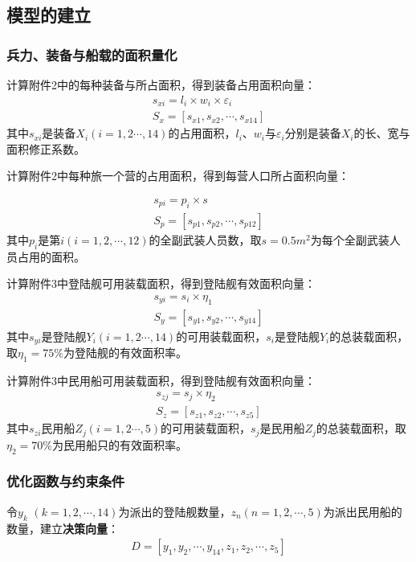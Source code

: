 \documentclass{whutmod}
\begin{document}
	    \subsection{模型的建立}
	    \subsubsection{兵力、装备与船载的面积量化}


	    计算附件2中的每种装备与所占面积，得到装备占用面积向量：
	    \begin{gather*}
	    s_{xi}=l_{i}\times w_{i} \times \varepsilon _{i}\\
	        S_{x}=[s_{x1},s_{x2},\cdots,s_{x14}]
	    \end{gather*}
	    其中$s_{xi}$是装备$X_{i}(i=1,2\cdots,14)$的占用面积，$l_{i}$、$w_{i}$与$\varepsilon _{i}$分别是装备$X_{i}$的长、宽与面积修正系数。
	    
	     计算附件2中每种旅一个营的占用面积，得到每营人口所占面积向量：


	     \begin{gather*}
	     s_{pi}=p_{i}\times s\\
	     S_{p}=[s_{p1},s_{p2},\cdots,s_{p12}]
	     \end{gather*}
	     其中$p_{i}$是第$i(i=1,2,\cdots,12)$的全副武装人员数，取$s=0.5m^2$为每个全副武装人员占用的面积。
	     
	     计算附件3中登陆舰可用装载面积，得到登陆舰有效面积向量：
	      \begin{gather*}
	      s_{yi}=s_{i}\times \eta_{1}\\
	      S_{y}=[s_{y1},s_{y2},\cdots,s_{y14}]
	      \end{gather*}
	    其中$s_{yi}$是登陆舰$Y_{i}(i=1,2\cdots,14)$的可用装载面积，$s_{i}$是登陆舰$Y_{i}$的总装载面积，取$\eta_{1}=75\%$为登陆舰的有效面积率。
	    
	    计算附件3中民用船可用装载面积，得到登陆舰有效面积向量：
	      \begin{gather*}
	      s_{zj}=s_{j}\times \eta_{2}\\
	      S_{z}=[s_{z1},s_{z2},\cdots,s_{z5}]
	      \end{gather*}
	       其中$s_{zi}$民用船$Z_{j}(i=1,2\cdots,5)$的可用装载面积，$s_{j}$是民用船$Z_{j}$的总装载面积，取$\eta_{2}=70\%$为民用船只的有效面积率。
	    \subsubsection{优化函数与约束条件}
	    令$y_{k} $ $(k=1,2,\cdots ,14)$为派出的登陆舰数量，$z_{n}$$(n=1,2,\cdots ,5)$为派出民用船的数量，建立\textbf{决策向量}：
	     \begin{gather*}
	     D=[y_{1},y_{2},\cdots,y_{14},z_{1},z_{2},\cdots,z_{5}]
	    \end{gather*}
	    
\end{document}
